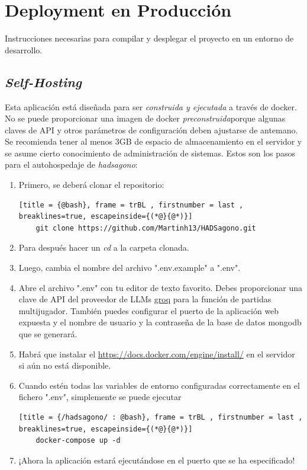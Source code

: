 \documentclass[12pt,epsf,titlepage,a4paper]{article}
\begin{document}
\section{Deployment en Producción}

Instrucciones necesarias para compilar y desplegar el proyecto en un entorno de desarrollo.

\subsection{\emph{Self-Hosting}} \label{selfhosting}

Esta aplicación está diseñada para ser \emph{construida y ejecutada} a través de docker. No se puede proporcionar una imagen de docker \emph{preconstruida}porque algunas claves de API y otros parámetros de configuración deben ajustarse de antemano. Se recomienda tener al menos 3GB de espacio de almacenamiento en el servidor y se asume cierto conocimiento de administración de sistemas. Estos son los pasos para el autohospedaje de \emph{hadsagono}:

\begin{enumerate}
    \item Primero, se deberá clonar el repositorio:
    \begin{lstlisting}[title = {@bash}, frame = trBL , firstnumber = last , breaklines=true, escapeinside={(*@}{@*)}]
    git clone https://github.com/Martinh13/HADSagono.git
    \end{lstlisting}
    \item Para después hacer un \emph{cd} a la carpeta clonada.
    \item Luego, cambia el nombre del archivo ".env.example" a ".env".
    \item Abre el archivo ".env" con tu editor de texto favorito. Debes proporcionar una clave de API del proveedor de LLMs \href{https://console.groq.com}{groq} para la función de partidas multijugador. También puedes configurar el puerto de la aplicación web expuesta y el nombre de usuario y la contraseña de la base de datos mongodb que se generará.
    \item Habrá que instalar el \href{motor de docker}{https://docs.docker.com/engine/install/} en el servidor si aún no está disponible.
    \item Cuando estén todas las variables de entorno configuradas correctamente en el fichero ".env", simplemente se puede ejecutar
    \begin{lstlisting}[title = {/hadsagono/ : @bash}, frame = trBL , firstnumber = last , breaklines=true, escapeinside={(*@}{@*)}]
    docker-compose up -d
    \end{lstlisting}
    \item ¡Ahora la aplicación estará ejecutándose en el puerto que se ha especificado!

\end{enumerate}
\end{document}
